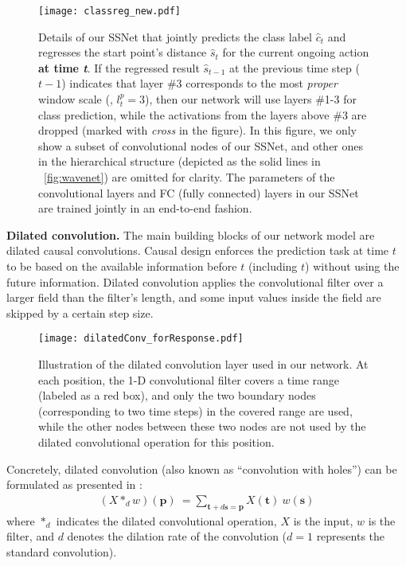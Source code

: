 \documentclass[10pt,twocolumn,letterpaper]{article}
\begin{document}
\begin{figure}[tp]
\centerline{\texttt{[image: classreg\_new.pdf]}}
\caption{Details of our SSNet that jointly predicts the class label $\hat{c}_t$ and regresses the start point's distance $\hat{s}_t$ for the current ongoing action \textbf{at time \emph{t}}.
If the regressed result $\hat{s}_{t-1}$ at the previous time step ($t-1$) indicates that layer \#3 corresponds to the most \emph{proper} window scale (\ie, $l_t^p=3$),
then our network will use layers \#1-3 for class prediction,
while the activations from the layers above \#3 are dropped (marked with \emph{cross} in the figure).
In this figure, we only show a subset of convolutional nodes of our SSNet,
and other ones in the hierarchical structure (depicted as the solid lines in \figurename{~\ref{fig:wavenet}}) are omitted for clarity.
The parameters of the convolutional layers and FC (fully connected) layers in our SSNet are trained jointly in an end-to-end fashion.
}
\label{fig:classreg}
\end{figure}

\textbf{Dilated convolution.}
The main building blocks of our network model are dilated causal convolutions. Causal design \cite{van2016wavenet} enforces the prediction task at time $t$ to be based on the available information before $t$ (including $t$) without using the future information.
Dilated convolution \cite{YuKoltun2016} applies the convolutional filter over a larger field than the filter's length,
and some input values inside the field are skipped by a certain step size.

\begin{figure}[tp]
	\centerline{\texttt{[image: dilatedConv\_forResponse.pdf]}}
	\caption{Illustration of the dilated convolution layer used in our network.
            At each position, the 1-D convolutional filter covers a time range (labeled as a red box),
            and only the two boundary nodes (corresponding to two time steps) in the covered range are used, while the other nodes between these two nodes are not used by the dilated convolutional operation for this position.
            }
	\label{fig:dilatedCausalConv}
\end{figure}

Concretely, dilated convolution (also known as ``convolution with holes'') can be formulated as presented in \cite{YuKoltun2016}:
\begin{eqnarray}
(X *_d w)(\mathbf{p}) ~ = \sum_{\mathbf{t} + d \mathbf{s} = \mathbf{p}} X(\mathbf{t}) ~ w(\mathbf{s})
\label{eq:dilatedConv}
\end{eqnarray}
where $*_d$ indicates the dilated convolutional operation, $X$ is the input, $w$ is the filter,
and $d$ denotes the dilation rate of the convolution ($d = 1$ represents the standard convolution).
\end{document}
